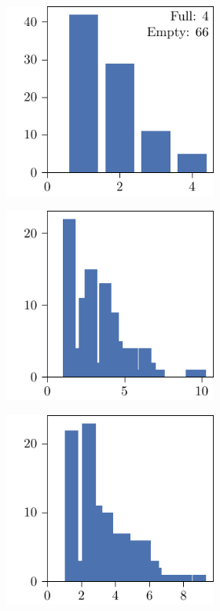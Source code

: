 \begin{figure}[p]
\begin{subfigure}{\textwidth}
\begin{subfigure}{\mymultiouter}
          \includegraphics[width=\mymultiinner]{figures/new/relaxed_common-diabetes-permutation-retraining}
    \end{subfigure}
  \end{subfigure}
  \centering
  \begin{subfigure}{\textwidth}
    \centering
    \begin{subfigure}{\mymultiouter}
        \centering
          \includegraphics[width=\mymultiinner]{figures/new/eucledian-diabetes-qlibra-permutation}
    \end{subfigure}
    \begin{subfigure}{\mymultiouter}
        \centering
          \includegraphics[width=\mymultiinner]{figures/new/eucledian-diabetes-qlibra-retraining}

\end{subfigure}
\end{subfigure}
\end{figure}
